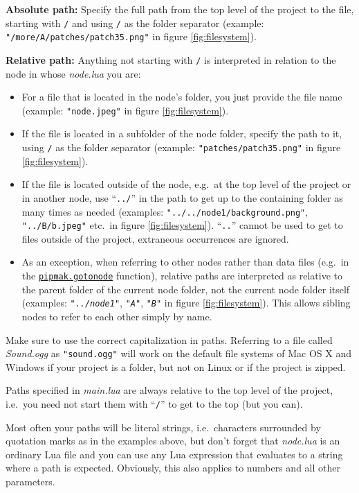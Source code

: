 \documentclass[
	a4paper,
	pagesize,
	10pt,
	oneside,
	idxtotoc,
	bibtotoc,
	BCOR10mm,
	DIV10
]{scrartcl} %
\newcommand{\lualink}[1]{\hyperlink{#1}{\texttt{#1}}}
\begin{document}
\textbf{Absolute path:} Specify the full path from the top level of the project to the file, starting with \texttt{/} and using \texttt{/} as the folder separator (example: \texttt{"/more/A/patches/patch35.png"} in figure \ref{fig:filesystem}).

\textbf{Relative path:} Anything not starting with \texttt{/} is interpreted in relation to the node in whose \emph{node.lua} you are:
\begin{itemize}
\item For a file that is located in the node's folder, you just provide the file name (example: \texttt{"node.jpeg"} in figure \ref{fig:filesystem}).
\item If the file is located in a subfolder of the node folder, specify the path to it, using \texttt{/} as the folder separator (example: \texttt{"patches/patch35.png"} in figure \ref{fig:filesystem}).
\item If the file is located outside of the node, e.g.\ at the top level of the project or in another node, use “\texttt{../}” in the path to get up to the containing folder as many times as needed (examples: \texttt{"../../node1/background.png"}, \texttt{"../B/b.jpeg"} etc.\ in figure \ref{fig:filesystem}). “\texttt{..}” cannot be used to get to files outside of the project, extraneous occurrences are ignored.
\item As an exception, when referring to other nodes rather than data files (e.g.\ in the \lualink{pipmak.gotonode} function), relative paths are interpreted as relative to the parent folder of the current node folder, not the current node folder itself (examples: \texttt{\textit{"../node1"}}, \texttt{\textit{"A"}}, \texttt{\textit{"B"}} in figure \ref{fig:filesystem}). This allows sibling nodes to refer to each other simply by name.
\end{itemize}

Make sure to use the correct capitalization in paths. Referring to a file called \emph{Sound.ogg} as \texttt{"sound.ogg"} will work on the default file systems of Mac OS X and Windows if your project is a folder, but not on Linux or if the project is zipped.

Paths specified in \emph{main.lua} are always relative to the top level of the project, i.e.\ you need not start them with “\texttt{/}” to get to the top (but you can).

Most often your paths will be literal strings, i.e.\ characters surrounded by quotation marks as in the examples above, but don't forget that \emph{node.lua} is an ordinary Lua file and you can use any Lua expression that evaluates to a string where a path is expected. Obviously, this also applies to numbers and all other parameters.
\end{document}
